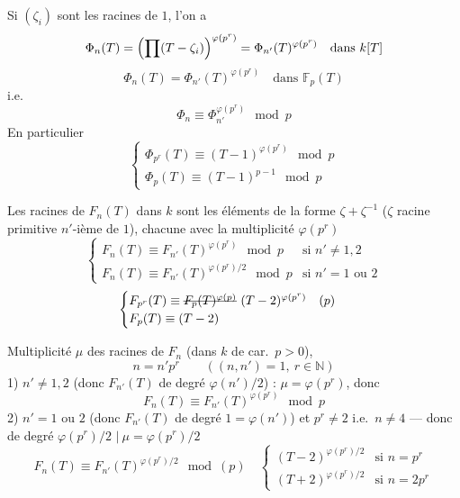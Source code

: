 \documentclass[11pt,a4paper]{article}
\begin{document}
Si $(\zeta_i)$ \struck{\ill{}} sont les racines  de $1$, \ill{} l'on a
\[
\Phi_n(T) = \Bigl(\prod(T-\zeta_i)\Bigr)^{\varphi(p^r)} = \Phi_{n'}(T)^{\varphi(p^r)} \quad\text{dans } k[T]
\]
\[
\Phi_n(T) = \Phi_{n'}(T)^{\varphi(p^r)} \quad\text{dans } \mathbb{F}_p(T)
\]
i.e.
\[
\Phi_n \equiv \Phi_{n'}^{\varphi(p^r)} \mod p
\]
En particulier
\[
\begin{cases}
\Phi_{p^r}(T) \equiv (T-1)^{\varphi(p^r)} \mod p\\
\Phi_p(T) \equiv (T-1)^{p-1} \mod p
\end{cases}
\]

Les racines de $F_n(T)$ dans $k$ sont les éléments de la forme $\zeta+\zeta^{-1}$ ($\zeta$ racine primitive $n'$-ième de $1$), chacune avec la multiplicité $\varphi(p^r)$ \struck{\ill{}}  
\[
\begin{cases}
F_n(T) \equiv F_{n'}(T)^{\varphi(p^r)} \mod p & \text{si } n'\neq 1,2\\
F_n(T) \equiv F_{n'}(T)^{\varphi(p^r)/2} \mod p & \text{si } n'=1 \text{ ou } 2
\end{cases}
\]
\[
\begin{cases}
F_{p^r}(T) \equiv \text{\struck{$F_p(T)^{\varphi(p)}$}}\ (T-2)^{\varphi(p^r)} \quad (p)\\
F_p(T) \equiv (T-2)
\end{cases}
\]

Multiplicité $\mu$ des racines de $F_n$  (dans $k$ de car.\ $p>0$),
\[
n = n'p^r \qquad ((n,n')=1,\ r\in\mathbb{N})
\]
1) $n'\neq 1,2$ (donc $F_{n'}(T)$ de degré $\varphi(n')/2$) : $\mu=\varphi(p^r)$, donc
\[
F_n(T) \equiv F_{n'}(T)^{\varphi(p^r)} \mod p
\]
2) $n'=1$ ou $2$ (donc $F_{n'}(T)$ de degré $1=\varphi(n')$)  et $p^r\neq 2$ i.e.\ $n\neq 4$ --- donc   de degré $\varphi(p^r)/2$ \qquad $\Big|\ \mu = \varphi(p^r)/2$
\[
F_n(T) \equiv F_{n'}(T)^{\varphi(p^r)/2} \mod (p)
\quad
\begin{cases}
(T-2)^{\varphi(p^r)/2} & \text{si } n=p^r\\
(T+2)^{\varphi(p^r)/2} & \text{si } n=2p^r
\end{cases}
\]
\end{document}

